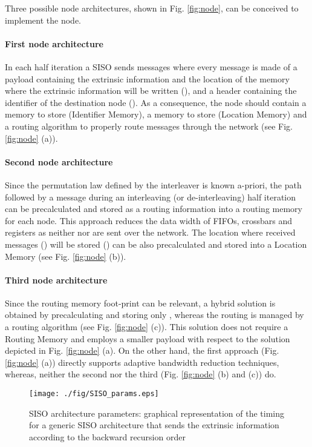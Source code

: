 \documentclass[10pt,twocolumn,journal]{IEEEtran}
\begin{document}
Three possible node architectures, shown in Fig. \ref{fig:node}, can be conceived to implement the node. 
\paragraph{First node architecture}
In each half iteration a SISO sends  messages where every message is made of a payload containing 
the extrinsic information and the location of the memory where the extrinsic information will be written (), and 
a header containing the identifier of the destination node (). 
As a consequence, the node should contain a memory to store  (Identifier Memory),
a memory to store  (Location Memory) and a routing algorithm to properly route messages through 
the network (see Fig. \ref{fig:node} (a)).
\paragraph{Second node architecture}
Since the permutation law defined by the interleaver is known a-priori, the path followed by 
a message during an interleaving (or de-interleaving) half iteration can be precalculated and stored 
as a routing information into a routing memory for each node. This approach 
reduces the data width of FIFOs, crossbars and registers as neither  nor  are sent over the 
network. The location where received messages () will be stored () can be also precalculated and stored into a Location Memory (see Fig. \ref{fig:node} (b)). 
\paragraph{Third node architecture}
Since the routing memory foot-print can be relevant, a hybrid solution is obtained by precalculating and storing 
only , whereas the routing is managed by a routing algorithm (see Fig. \ref{fig:node} (c)).
This solution does not require a Routing Memory and employs a smaller payload with respect to the solution depicted 
in Fig. \ref{fig:node} (a). On the other hand, the first approach (Fig. \ref{fig:node} (a)) directly supports adaptive 
bandwidth reduction techniques, whereas, neither the second nor the third (Fig. \ref{fig:node} (b) and (c)) do.

\begin{figure}
  \centering
  \texttt{[image: ./fig/SISO\_params.eps]}
\caption{SISO architecture parameters: graphical representation of the timing for a generic SISO architecture 
that sends the extrinsic information according to the backward recursion order}
\label{fig:SISO_params}
\end{figure}
\end{document}
